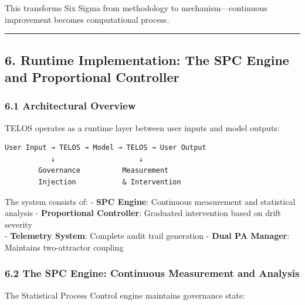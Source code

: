 This transforms Six Sigma from methodology to mechanism---continuous
improvement becomes computational process.

\begin{center}\rule{0.5\linewidth}{0.5pt}\end{center}

\subsection{6. Runtime Implementation: The SPC Engine and Proportional
Controller}\label{runtime-implementation-the-spc-engine-and-proportional-controller}

\subsubsection{6.1 Architectural Overview}\label{architectural-overview}

TELOS operates as a runtime layer between user inputs and model outputs:

\begin{verbatim}
User Input → TELOS → Model → TELOS → User Output
           ↓                    ↓
        Governance          Measurement
        Injection           & Intervention
\end{verbatim}

The system consists of: - \textbf{SPC Engine}: Continuous measurement
and statistical analysis - \textbf{Proportional Controller}: Graduated
intervention based on drift severity\\
- \textbf{Telemetry System}: Complete audit trail generation -
\textbf{Dual PA Manager}: Maintains two-attractor coupling

\subsubsection{6.2 The SPC Engine: Continuous Measurement and
Analysis}\label{the-spc-engine-continuous-measurement-and-analysis}

The Statistical Process Control engine maintains governance state:

